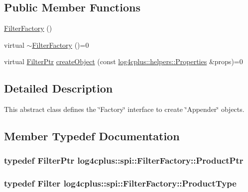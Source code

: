 \subsection*{Public Member Functions}
\begin{DoxyCompactItemize}
\item 
\hyperlink{classlog4cplus_1_1spi_1_1FilterFactory_af0c9844b97589c15422d7dfeeb93fe5e}{Filter\-Factory} ()
\item 
virtual \hyperlink{classlog4cplus_1_1spi_1_1FilterFactory_a965dbac23e12204d8cac6765acbc8af0}{$\sim$\-Filter\-Factory} ()=0
\item 
virtual \hyperlink{namespacelog4cplus_1_1spi_abfdea757523ce8fe4598502a29bc7545}{Filter\-Ptr} \hyperlink{classlog4cplus_1_1spi_1_1FilterFactory_a4b3997b6d4c145f69557a4eea11c90f8}{create\-Object} (const \hyperlink{classlog4cplus_1_1helpers_1_1Properties}{log4cplus\-::helpers\-::\-Properties} \&props)=0
\end{DoxyCompactItemize}


\subsection{Detailed Description}
This abstract class defines the \char`\"{}\-Factory\char`\"{} interface to create \char`\"{}\-Appender\char`\"{} objects. 

\subsection{Member Typedef Documentation}
\hypertarget{classlog4cplus_1_1spi_1_1FilterFactory_abab76c9c84cfb09660bdf8dca848f568}{
\subsubsection[{Product\-Ptr}]{\setlength{\rightskip}{0pt plus 5cm}typedef {\bf Filter\-Ptr} {\bf log4cplus\-::spi\-::\-Filter\-Factory\-::\-Product\-Ptr}}}\label{classlog4cplus_1_1spi_1_1FilterFactory_abab76c9c84cfb09660bdf8dca848f568}
\hypertarget{classlog4cplus_1_1spi_1_1FilterFactory_a32b9b9673dd35de64ed4e248b680ffc5}{
\subsubsection[{Product\-Type}]{\setlength{\rightskip}{0pt plus 5cm}typedef {\bf Filter} {\bf log4cplus\-::spi\-::\-Filter\-Factory\-::\-Product\-Type}}}\label{classlog4cplus_1_1spi_1_1FilterFactory_a32b9b9673dd35de64ed4e248b680ffc5}


